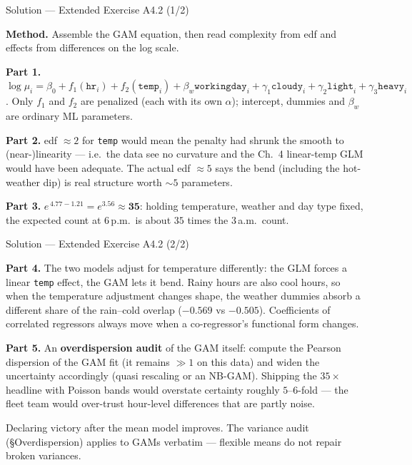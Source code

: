 \documentclass[aspectratio=169,11pt]{beamer}
\begin{document}
\begin{frame}{Solution --- Extended Exercise A4.2 (1/2)}
\begin{solutionbox}
  \textbf{Method.} Assemble the GAM equation, then read complexity from edf and
  effects from differences on the log scale.

  \textbf{Part 1.}
  $\log\mu_i = \beta_0 + f_1(\texttt{hr}_i) + f_2(\texttt{temp}_i)
  + \beta_w \texttt{workingday}_i + \gamma_1\texttt{cloudy}_i
  + \gamma_2\texttt{light}_i + \gamma_3\texttt{heavy}_i$.
  Only $f_1$ and $f_2$ are penalized (each with its own $\alpha$); intercept, dummies
  and $\beta_w$ are ordinary ML parameters.

  \textbf{Part 2.} edf $\approx 2$ for \texttt{temp} would mean the penalty had shrunk
  the smooth to (near-)linearity --- i.e.\ the data see no curvature and the Ch.\ 4
  linear-temp GLM would have been adequate. The actual edf $\approx 5$ says the bend
  (including the hot-weather dip) is real structure worth $\sim\!5$ parameters.

  \textbf{Part 3.} $e^{\,4.77 - 1.21} = e^{3.56} \approx \mathbf{35}$: holding
  temperature, weather and day type fixed, the expected count at 6\,p.m.\ is about
  $35$ times the 3\,a.m.\ count.
\end{solutionbox}
\end{frame}

\begin{frame}{Solution --- Extended Exercise A4.2 (2/2)}
\begin{solutionbox}
  \textbf{Part 4.} The two models adjust for temperature differently: the GLM forces a
  linear \texttt{temp} effect, the GAM lets it bend. Rainy hours are also cool hours,
  so when the temperature adjustment changes shape, the weather dummies absorb a
  different share of the rain--cold overlap ($-0.569$ vs $-0.505$). Coefficients of
  correlated regressors always move when a co-regressor's functional form changes.

  \textbf{Part 5.} An \textbf{overdispersion audit} of the GAM itself: compute the
  Pearson dispersion of the GAM fit (it remains $\gg 1$ on this data) and widen the
  uncertainty accordingly (quasi rescaling or an NB-GAM). Shipping the $35\times$
  headline with Poisson bands would overstate certainty roughly $5$--$6$-fold ---
  the fleet team would over-trust hour-level differences that are partly noise.
\end{solutionbox}
\begin{mistake}
  Declaring victory after the mean model improves. The variance audit
  (\S Overdispersion) applies to GAMs verbatim --- flexible means do not repair
  broken variances.
\end{mistake}
\end{frame}
\end{document}
